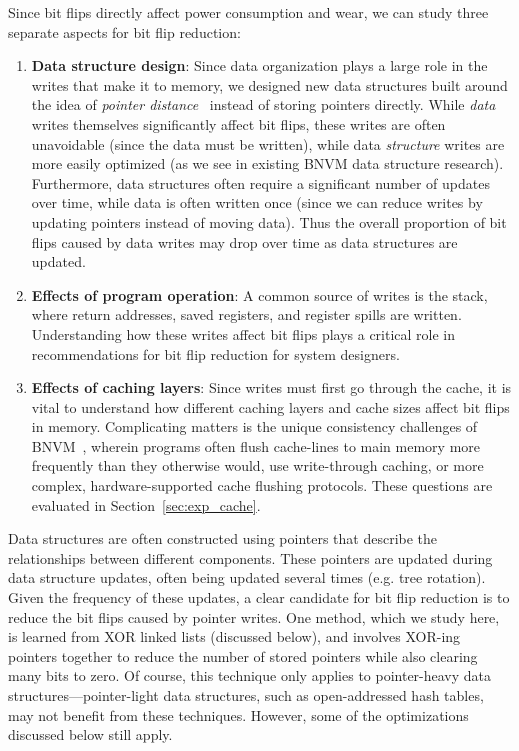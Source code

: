 Since bit flips directly affect power consumption and wear, we
can study three separate aspects for bit flip reduction:
\begin{enumerate}
	\item \textbf{Data structure design}: Since data organization plays a large role
	      in the writes that make it to memory, we designed new data structures built
	      around the idea of \textit{pointer distance}~\cite{xorll} instead of storing
	      pointers directly. While \emph{data} writes themselves significantly affect bit flips, these writes
	      are often unavoidable (since the data must be written), while data \emph{structure} writes are more
	      easily optimized (as we see in existing BNVM data structure research).
	      Furthermore, data structures often require a significant number of updates
	      over time, while data is often written once (since we can reduce writes by updating pointers instead
	      of moving data). Thus the overall proportion of bit flips caused by data writes may drop over time as
	      data structures are updated.
	\item \textbf{Effects of program operation}: A common source of writes is
	      the stack, where return addresses, saved registers, and
	      register spills are written. Understanding how these writes affect bit flips
	      plays a critical role in recommendations for bit flip reduction for system designers.
	\item \textbf{Effects of caching layers}: Since writes must first go through the
	      cache, it is vital to understand how different caching layers and cache sizes
	      affect bit flips in memory. Complicating matters is the unique consistency
	      challenges of BNVM~\cite{coburn:asplos11,volos:asplos11,condit:sosp09}, wherein programs often flush cache-lines to main
	      memory more frequently than they otherwise would, use write-through caching, or
	      more complex, hardware-supported cache flushing protocols. These questions are evaluated in
	      Section~\ref{sec:exp_cache}.
\end{enumerate}

	Data structures are often constructed using pointers that describe the
	relationships between different components. These pointers are updated during
	data structure updates, often being updated several times (e.g. tree rotation).
	Given the frequency of these updates, a clear candidate for bit flip reduction
	is to reduce the bit flips caused by pointer writes. One method, which we study
	here, is learned from XOR linked lists (discussed below), and involves XOR-ing
	pointers together to reduce the number of stored pointers while also clearing
	many bits to zero.  Of course, this technique only applies to pointer-heavy data
	structures---pointer-light data structures, such as open-addressed hash tables,
	may not benefit from these techniques. However, some of the optimizations
	discussed below still apply.
\fi
